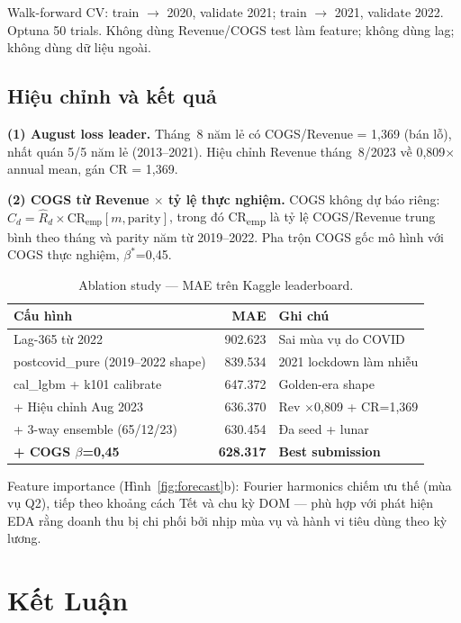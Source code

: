 \documentclass{article}
\begin{document}
Walk-forward CV: train $\to$ 2020, validate 2021; train $\to$ 2021, validate 2022.
Optuna 50 trials. Không dùng Revenue/COGS test làm feature; không dùng lag; không dùng dữ liệu ngoài.

\subsection{Hiệu chỉnh và kết quả}

\textbf{(1) August loss leader.}
Tháng~8 năm lẻ có COGS/Revenue = 1,369 (bán lỗ), nhất quán 5/5 năm lẻ (2013--2021).
Hiệu chỉnh Revenue tháng~8/2023 về 0,809$\times$ annual mean, gán CR = 1,369.

\textbf{(2) COGS từ Revenue $\times$ tỷ lệ thực nghiệm.}
COGS không dự báo riêng: $\hat{C}_d = \hat{R}_d \times \text{CR}_{\text{emp}}[m, \text{parity}]$,
trong đó CR\textsubscript{emp} là tỷ lệ COGS/Revenue trung bình theo tháng và parity năm từ 2019--2022.
Pha trộn COGS gốc mô hình với COGS thực nghiệm, $\beta^{*}$=0,45.

\begin{table}[h]
\centering
\small
\caption{Ablation study --- MAE trên Kaggle leaderboard.}
\label{tab:ablation}
\begin{tabular}{lrl}
\toprule
Cấu hình & MAE & Ghi chú \\
\midrule
Lag-365 từ 2022                    & 902.623 & Sai mùa vụ do COVID \\
postcovid\_pure (2019--2022 shape) & 839.534 & 2021 lockdown làm nhiễu \\
cal\_lgbm + k101 calibrate         & 647.372 & Golden-era shape \\
+ Hiệu chỉnh Aug 2023             & 636.370 & Rev $\times$0,809 + CR=1,369 \\
+ 3-way ensemble (65/12/23)        & 630.454 & Đa seed + lunar \\
\textbf{+ COGS $\beta$=0,45}       & \textbf{628.317} & \textbf{Best submission} \\
\bottomrule
\end{tabular}
\end{table}

Feature importance (Hình~\ref{fig:forecast}b): Fourier harmonics chiếm ưu thế (mùa vụ Q2),
tiếp theo khoảng cách Tết và chu kỳ DOM --- phù hợp với phát hiện EDA
rằng doanh thu bị chi phối bởi nhịp mùa vụ và hành vi tiêu dùng theo kỳ lương.

\section{Kết Luận}
\end{document}
